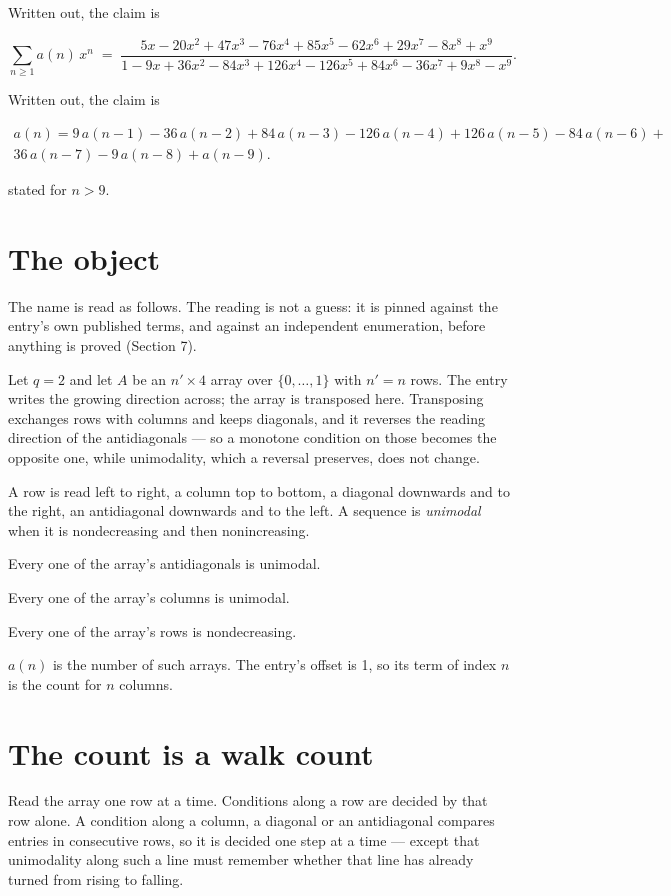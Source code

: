 \documentclass[11pt]{article}
\theoremstyle{definition}
\begin{document}
Written out, the claim is

\[\sum_{n \ge 1} a(n)\,x^n \;=\; \frac{5x - 20x^{2} + 47x^{3} - 76x^{4} + 85x^{5} - 62x^{6} + 29x^{7} - 8x^{8} + x^{9}}{1 - 9x + 36x^{2} - 84x^{3} + 126x^{4} - 126x^{5} + 84x^{6} - 36x^{7} + 9x^{8} - x^{9}}.\]

Written out, the claim is

\begin{multline*} a(n) = 9\,a(n-1) - 36\,a(n-2) + 84\,a(n-3) - 126\,a(n-4) + 126\,a(n-5) - 84\,a(n-6) + \\ 36\,a(n-7) - 9\,a(n-8) + a(n-9). \end{multline*}

stated for $n > 9$.

\section{The object}

The name is read as follows. The reading is not a guess: it is pinned against the entry's own published terms, and against an independent enumeration, before anything is proved (Section 7).

Let $q = 2$ and let $A$ be an $n' \times 4$ array over $\{0,\dots,1\}$ with $n' = n$ rows. The entry writes the growing direction across; the array is transposed here. Transposing exchanges rows with columns and keeps diagonals, and it reverses the reading direction of the antidiagonals --- so a monotone condition on those becomes the opposite one, while unimodality, which a reversal preserves, does not change.

A row is read left to right, a column top to bottom, a diagonal downwards and to the right, an antidiagonal downwards and to the left. A sequence is {\itshape unimodal} when it is nondecreasing and then nonincreasing.

Every one of the array's antidiagonals is unimodal.

Every one of the array's columns is unimodal.

Every one of the array's rows is nondecreasing.

$a(n)$ is the number of such arrays. The entry's offset is 1, so its term of index $n$ is the count for $n$ columns.

\section{The count is a walk count}

Read the array one row at a time. Conditions along a row are decided by that row alone. A condition along a column, a diagonal or an antidiagonal compares entries in consecutive rows, so it is decided one step at a time --- except that unimodality along such a line must remember whether that line has already turned from rising to falling.
\end{document}
